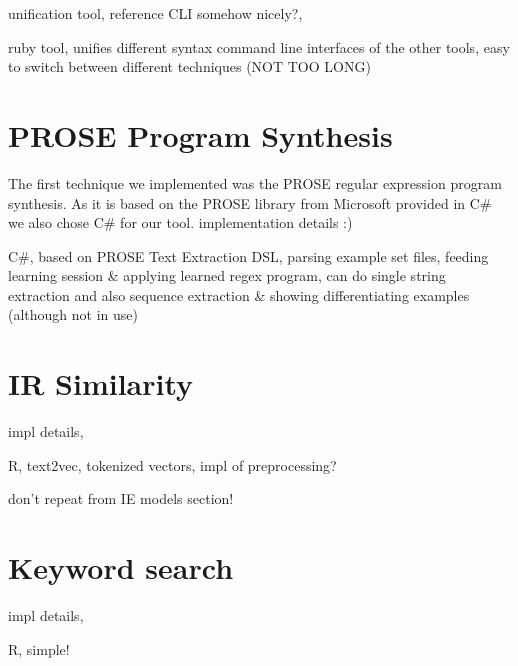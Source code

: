 \documentclass[\myrootdir/main.tex]{subfiles}
\begin{document}
unification tool, reference CLI somehow nicely?,

ruby tool, unifies different syntax command line interfaces of the other tools, easy to switch between different techniques (NOT TOO LONG)

\section{PROSE Program Synthesis}
The first technique we implemented was the PROSE regular expression program synthesis. As it is based on the PROSE library from Microsoft provided in C\# we also chose C\# for our tool. 
implementation details :)

C\#, based on PROSE Text Extraction DSL, parsing example set files, feeding learning session \& applying learned regex program, can do single string extraction and also sequence extraction \& showing differentiating examples (although not in use)

\section{IR Similarity}
impl details,

R, text2vec, tokenized vectors, impl of preprocessing?

don't repeat from IE models section!

\section{Keyword search}
impl details,

R, simple!
\end{document}
